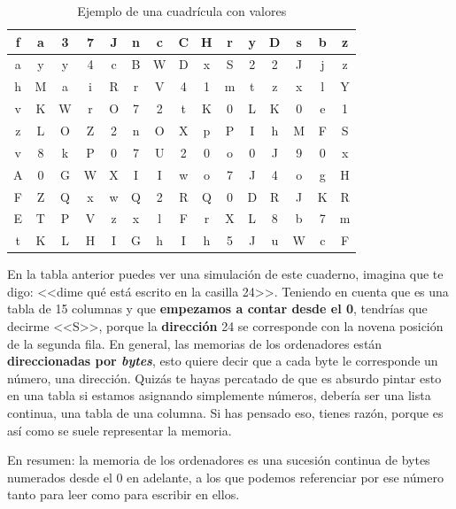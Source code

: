\documentclass[a4paper]{article}
\begin{document}
\begin{table}[H]
    \centering
    \begin{tabular}{|c|c|c|c|c|c|c|c|c|c|c|c|c|c|c|}
        \hline
f&a&3&7&J&n&c&C&H&r&y&D&s&b&z\\\hline
a&y&y&4&c&B&W&D&x&S&2&2&J&j&z\\\hline
h&M&a&i&R&r&V&4&1&m&t&z&x&l&Y\\\hline
v&K&W&r&O&7&2&t&K&0&L&K&0&e&1\\\hline
z&L&O&Z&2&n&O&X&p&P&I&h&M&F&S\\\hline
v&8&k&P&0&7&U&2&0&o&0&J&9&0&x\\\hline
A&0&G&W&X&I&I&w&o&7&J&4&o&g&H\\\hline
F&Z&Q&x&w&Q&2&R&Q&0&D&R&J&K&R\\\hline
E&T&P&V&z&x&l&F&r&X&L&8&b&7&m\\\hline
t&K&L&H&I&G&h&I&h&5&J&u&W&c&F\\\hline
    \end{tabular}
    \caption{Ejemplo de una cuadrícula con valores}
    \label{tab:notebookSimulation}
\end{table}

En la tabla anterior puedes ver una simulación de este cuaderno, imagina que te
digo: <<dime qué está escrito en la casilla 24>>. Teniendo en cuenta que es una
tabla de 15 columnas y que \textbf{empezamos a contar desde el 0}, tendrías que
decirme <<S>>, porque la \textbf{dirección} 24 se corresponde con la novena
posición de la segunda fila. En general, las memorias
de los ordenadores están \textbf{direccionadas por \textit{bytes}}, esto quiere
decir que a cada byte le corresponde un número, una dirección. Quizás te hayas
percatado de que es absurdo pintar esto en una tabla si estamos asignando
simplemente números, debería ser una lista continua, una tabla de una columna.
Si has pensado eso, tienes razón, porque es así como se suele representar la
memoria.

En resumen: la memoria de los ordenadores es una sucesión continua de bytes
numerados desde el 0 en adelante, a los que podemos referenciar por ese número
tanto para leer como para escribir en ellos.
\end{document}
